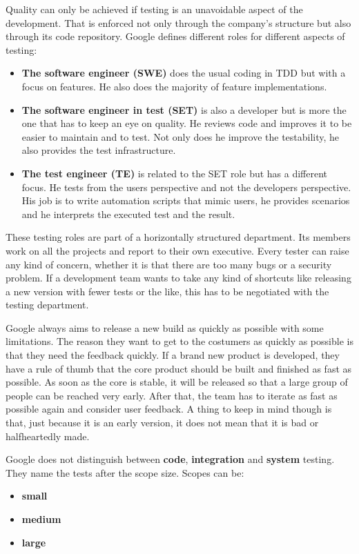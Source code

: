     Quality can only be achieved if testing is an unavoidable aspect of the development. That is enforced not only through the company's structure but also through its code repository. Google defines different roles for different aspects of testing:
    \begin{itemize}
        \item \textbf{The software engineer (SWE) } does the usual coding in TDD but with a focus on features. He also does the majority of feature implementations.
        \item \textbf{The software engineer in test (SET)} is also a developer but is more the one that has to keep an eye on quality. He reviews code and improves it to be easier to maintain and to test. Not only does he improve the testability, he also provides the test infrastructure. 
        \item \textbf{The test engineer (TE)} is related to the SET role but has a different focus. He tests from the users perspective and not the developers perspective. His job is to write automation scripts that mimic users, he provides scenarios and he interprets the executed test and the result. 
    \end{itemize}
    These testing roles are part of a horizontally structured department. Its members work on all the projects and report to their own executive. 
    Every tester can raise any kind of concern, whether it is that there are too many bugs or a security problem. If a development team wants to take any kind of shortcuts like releasing a new version with fewer tests or the like, this has to be negotiated with the testing department. 

    Google always aims to release a new build as quickly as possible with some limitations. 
    The reason they want to get to the costumers as quickly as possible is that they need the feedback quickly. 
    If a brand new product is developed, they have a rule of thumb that the core product should be built and finished as fast as possible.
    As soon as the core is stable, it will be released so that a large group of people can be reached very early. 
    After that, the team has to iterate as fast as possible again and consider user feedback. 
    A thing to keep in mind though is that, just because it is an early version, it does not mean that it is bad or halfheartedly made.

    Google does not distinguish between \textbf{code}, \textbf{integration} and \textbf{system} testing. They name the tests after the scope size. Scopes can be:
    \begin{itemize}
        \item  \textbf{small} 
        \item  \textbf{medium}
        \item  \textbf{large}
    \end{itemize}


